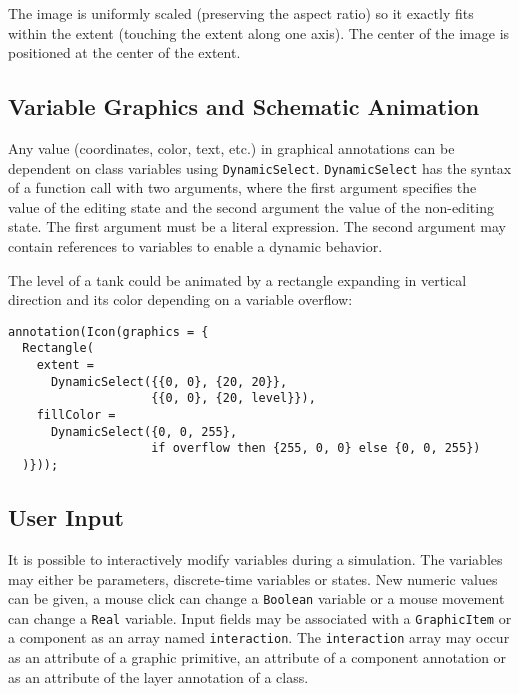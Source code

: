 The image is uniformly scaled (preserving the aspect ratio) so it exactly fits within the extent (touching the extent along one axis).
The center of the image is positioned at the center of the extent.

\subsection{Variable Graphics and Schematic Animation}\label{variable-graphics-and-schematic-animation}

Any value (coordinates, color, text, etc.) in graphical annotations can be dependent on class variables using \lstinline!DynamicSelect!.
\lstinline!DynamicSelect! has the syntax of a function call with two arguments, where the first argument specifies the value of the editing state and the second argument the value of the non-editing state.
The first argument must be a literal expression.
The second argument may contain references to variables to enable a dynamic behavior.

\begin{example}
The level of a tank could be animated by a rectangle expanding in vertical direction and its color depending on a variable overflow:
\begin{lstlisting}[language=modelica]
annotation(Icon(graphics = {
  Rectangle(
    extent =
      DynamicSelect({{0, 0}, {20, 20}},
                    {{0, 0}, {20, level}}),
    fillColor =
      DynamicSelect({0, 0, 255},
                    if overflow then {255, 0, 0} else {0, 0, 255})
  )}));
\end{lstlisting}
\end{example}

\subsection{User Input}\label{user-input}

It is possible to interactively modify variables during a simulation.
The variables may either be parameters, discrete-time variables or states.
New numeric values can be given, a mouse click can change a \lstinline!Boolean! variable or a mouse movement can change a \lstinline!Real! variable.
Input fields may be associated with a \lstinline!GraphicItem! or a component as an array named \lstinline!interaction!.
The \lstinline!interaction! array may occur as an attribute of a graphic primitive, an attribute of a component annotation or as an attribute of the layer annotation of a class.


